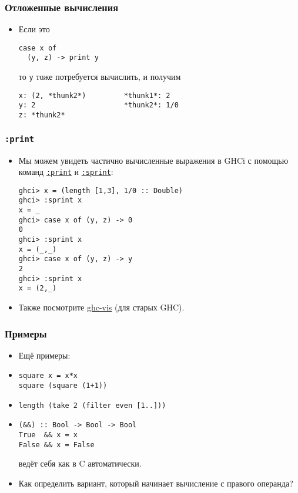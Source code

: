 \documentclass[11pt]{beamer}
\begin{document}
\begin{frame}[fragile]
  \frametitle{Отложенные вычисления}
  \begin{itemize}
    \item Если это
          \begin{lstlisting}[basicstyle=\ttfamily\small]
case x of
  (y, z) -> print y
\end{lstlisting}
          то \lstinline|y| тоже потребуется вычислить, и получим \pause
          \begin{lstlisting}[basicstyle=\ttfamily\small]
x: (2, *thunk2*)         *thunk1*: 2
y: 2                     *thunk2*: 1/0
z: *thunk2*
\end{lstlisting}
  \end{itemize}
\end{frame}

\begin{frame}[fragile]
  \frametitle{\lstinline|:print|}
  \begin{itemize}
    \item Мы можем увидеть частично вычисленные выражения в GHCi с помощью команд \href{https://downloads.haskell.org/~ghc/8.6.3/docs/html/users_guide/ghci.html#ghci-cmd-:print}{\lstinline|:print|} и \href{https://downloads.haskell.org/~ghc/8.6.3/docs/html/users_guide/ghci.html#ghci-cmd-:sprint}{\lstinline|:sprint|}:
          \begin{lstlisting}[basicstyle=\ttfamily\small]
ghci> x = (length [1,3], 1/0 :: Double)
ghci> :sprint x
x = _
ghci> case x of (y, z) -> 0
0
ghci> :sprint x
x = (_,_)
ghci> case x of (y, z) -> y
2
ghci> :sprint x
x = (2,_)
\end{lstlisting}
          \pause
    \item Также посмотрите \href{http://felsin9.de/nnis/ghc-vis/}{ghc-vis} (для старых GHC).
  \end{itemize}
\end{frame}

\begin{frame}[fragile]
  \frametitle{Примеры}
  \begin{itemize}
    \item Ещё примеры:
          \pause
    \item
          \begin{lstlisting}
square x = x*x
square (square (1+1))
\end{lstlisting}
    \item \lstinline|length (take 2 (filter even [1..]))|
          \pause
    \item
          \begin{lstlisting}
(&&) :: Bool -> Bool -> Bool
True  && x = x
False && x = False
\end{lstlisting}
          ведёт себя как в C автоматически.
          \pause
    \item Как определить вариант, который начинает вычисление с правого операнда?
  \end{itemize}
\end{frame}
\end{document}
